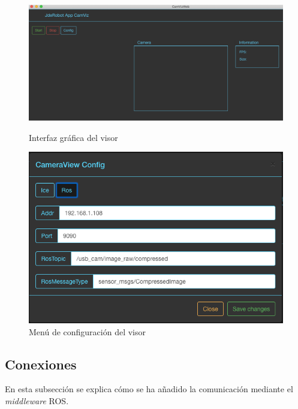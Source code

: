 \begin{figure}[htb]
\centering
  \begin{minipage}{0.45\textwidth}
    \centering
    \includegraphics[width=1\textwidth]{figures/interfazcamviz.png}
    \caption{Interfaz gráfica del visor}
    \label{fig.iterfazcamviz}
  \end{minipage}%
  \hspace{5mm}
  \begin{minipage}{0.45\textwidth}
    \centering
    \includegraphics[width=1\textwidth]{figures/configuracioncamviz.png}
    \caption{Menú de configuración del visor}
    \label{fig.configuracioncamviz}
  \end{minipage}
\end{figure}

\subsection{Conexiones}

En esta subsección se explica cómo se ha añadido la comunicación mediante el \textit{middleware} ROS.

